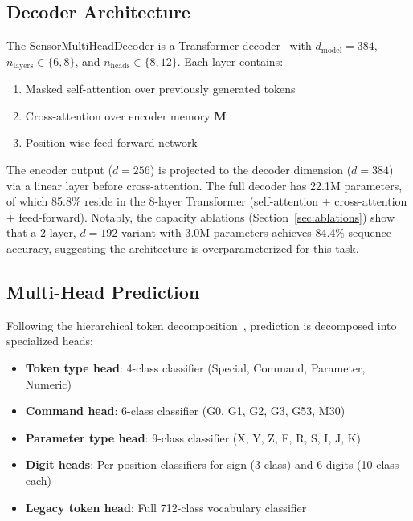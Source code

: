 \documentclass[sensors,article,submit,moreauthors,pdftex]{Definitions/mdpi}
\newcommand{\decodername}{SensorMultiHeadDecoder}
\begin{document}
\subsection{Decoder Architecture}

The \decodername{} is a Transformer decoder~\cite{vaswani2017attention} with $d_\text{model} = 384$, $n_\text{layers} \in \{6, 8\}$, and $n_\text{heads} \in \{8, 12\}$. Each layer contains:

\begin{enumerate}[leftmargin=*]
    \item Masked self-attention over previously generated tokens
    \item Cross-attention over encoder memory $\mathbf{M}$
    \item Position-wise feed-forward network
\end{enumerate}

The encoder output ($d = 256$) is projected to the decoder dimension ($d = 384$) via a linear layer before cross-attention. The full decoder has 22.1M parameters, of which 85.8\% reside in the 8-layer Transformer (self-attention + cross-attention + feed-forward). Notably, the capacity ablations (Section~\ref{sec:ablations}) show that a 2-layer, $d{=}192$ variant with 3.0M parameters achieves 84.4\% sequence accuracy, suggesting the architecture is overparameterized for this task.

\subsection{Multi-Head Prediction}

Following the hierarchical token decomposition~\cite{grammar_paper}, prediction is decomposed into specialized heads:

\begin{itemize}[leftmargin=*]
    \item \textbf{Token type head}: 4-class classifier (Special, Command, Parameter, Numeric)
    \item \textbf{Command head}: 6-class classifier (G0, G1, G2, G3, G53, M30)
    \item \textbf{Parameter type head}: 9-class classifier (X, Y, Z, F, R, S, I, J, K)
    \item \textbf{Digit heads}: Per-position classifiers for sign (3-class) and 6 digits (10-class each)
    \item \textbf{Legacy token head}: Full 712-class vocabulary classifier
\end{itemize}
\end{document}
